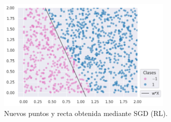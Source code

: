 \documentclass[a4paper, 20pt]{article}
\begin{document}
\begin{figure}[H]
    \centering
    \includegraphics[width=0.75\textwidth]{2test}
    \caption{Nuevos puntos y recta obtenida mediante SGD (RL).}
    \label{fig:2btest}
\end{figure}

\newpage
\printbibliography
\end{document}

